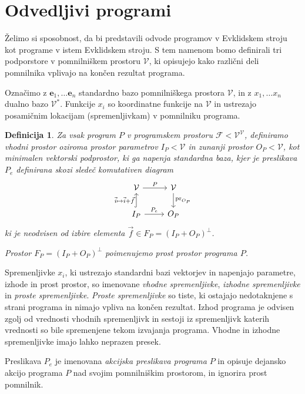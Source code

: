 \documentclass[a4paper, 12pt]{book}
\newcommand{\VV}{\mathcal{V}}
\newcommand{\e}{\mathbf{e}}
\newcommand{\F}{\mathcal{F}}
\newtheorem{definicija}{Definicija}[chapter]
\begin{document}
\section{Odvedljivi programi}

Želimo si sposobnost, da bi predstavili odvode programov v Evklidskem stroju kot programe v istem Evklidskem stroju. S tem namenom bomo definirali tri podporstore v pomnilniškem prostoru $\VV$, ki opisujejo kako različni deli pomnilnika vplivajo na končen rezultat programa.

Označimo z $\e_1,\ldots \e_n$ standardno bazo pomnilniškega prostora $\VV$, in z $x_1,\ldots x_n$ dualno bazo $\VV^*$. Funkcije $x_i$ so koordinatne funkcije na $\VV$ in ustrezajo posamičnim lokacijam (spremenljivkam) v pomnilniku programa.
\begin{definicija}
Za vsak program $P$ v programskem prostoru $\F<\VV^\VV$, definiramo vhodni prostor oziroma prostor parametrov $I_P<\VV$ in zunanji prostor $O_P<\VV$, kot minimalen vektorski podprostor, ki ga napenja standardna baza, kjer je preslikava $P_e$ definirana skozi sledeč komutativen diagram
\begin{equation} 
    \label{eq:induced_map}
\begin{tikzcd}
  \VV \arrow{r}{P} & 
  \VV \arrow{d}{\mathrm{pr}_{O_P}}\\
  I_P \arrow[hook]{u}{\vec{i}\mapsto \vec{i}+\vec{f}} 
  \arrow{r}{P_e}& O_P
\end{tikzcd}
  \end{equation}
ki je neodvisen od izbire elementa $\vec{f}\in F_P=(I_P+O_P)^\perp$.

Prostor $F_P=(I_P+O_P)^\perp$ poimenujemo prost prostor programa $P$.
\end{definicija}

Spremenljivke $x_i$, ki ustrezajo standardni bazi vektorjev in napenjajo parametre, izhode in prost prostor, so imenovane \emph{vhodne spremenljivke}, \emph{izhodne spremenljivke} in \emph{proste spremenljivke}. \emph{Proste spremenljivke} so tiste, ki ostajajo nedotaknjene s strani programa in nimajo vpliva na končen rezultat. Izhod programa je odvisen zgolj od vrednosti vhodnih spremenljivk in sestoji iz spremenljivk katerih vrednosti so bile spremenjene tekom izvajanja programa. Vhodne in izhodne spremenljivke imajo lahko neprazen presek.

Preslikava $P_e$ je imenovana \emph{akcijska preslikava programa} $P$ in opisuje dejansko akcijo programa $P$ nad svojim pomnilniškim prostorom, in ignorira prost pomnilnik.
\end{document}

